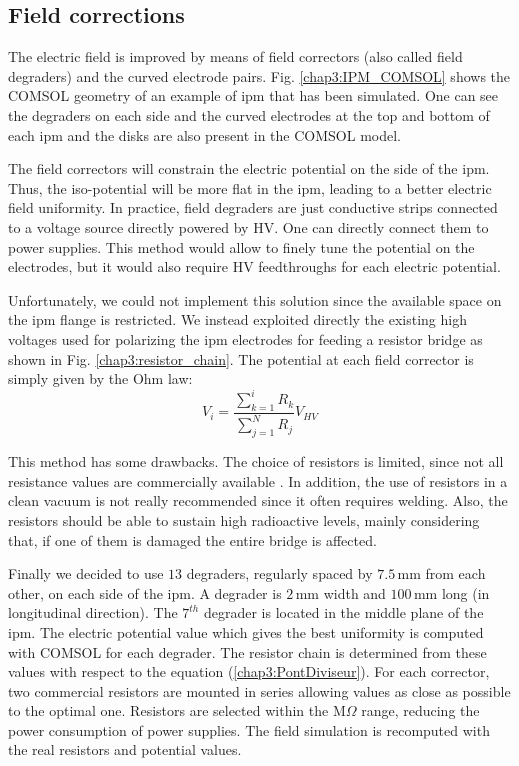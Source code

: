 \begin{refsection}
  \subsection{Field corrections}
  \label{chap3:field_corrections}
  
  The electric field is improved by means of field correctors (also called field degraders) and the curved electrode pairs. Fig. \ref{chap3:IPM_COMSOL} shows the COMSOL geometry of an example of \acrshort{ipm} that has been simulated. One can see the degraders on each side and the curved electrodes at the top and bottom of each \acrshort{ipm} and the disks are also present in the COMSOL model.

  The field correctors will constrain the electric potential on the side of the \acrshort{ipm}. Thus, the iso-potential will be more flat in the \acrshort{ipm}, leading to a better electric field uniformity. In practice, field degraders are just conductive strips connected to a voltage
  source directly powered by HV. One can directly connect them to power supplies. This method would allow to finely tune the potential on the electrodes, but it would also require HV feedthroughs for each electric potential.

  
  Unfortunately, we could not implement this solution since the available space on the \acrshort{ipm} flange is restricted. We instead exploited directly the existing high voltages used for polarizing the \acrshort{ipm} electrodes for feeding a resistor bridge as shown in Fig. \ref{chap3:resistor_chain}. The potential at each field corrector is simply given by the Ohm law:
  \begin{equation}
    V_{i} = \frac{\sum_{k = 1}^{i} R_{k}}{\sum_{j = 1}^{N} R_{j}}V_{HV} \label{chap3:PontDiviseur}
  \end{equation}

  This method has some drawbacks. The choice of resistors is limited, since not all resistance values are commercially available \cite{Vishay2012}. In addition, the use of resistors in a clean vacuum is not really recommended since it often requires welding. Also, the resistors should be able to sustain high radioactive levels, mainly considering that, if one of them is damaged the entire bridge is affected.

  Finally we decided to use $13$ degraders, regularly spaced by $7.5\,\mathrm{mm}$ from each other, on each side of the \acrshort{ipm}. A degrader is $2\,\mathrm{mm}$ width and $100\,\mathrm{mm}$ long (in longitudinal direction). The $7^{th}$ degrader is located in the middle plane of the \acrshort{ipm}.
  The electric potential value which gives the best uniformity is computed with COMSOL for each degrader. The resistor chain is determined from these values with respect to the equation (\ref{chap3:PontDiviseur}). For each corrector, two commercial resistors are mounted in series allowing values as close as possible to the optimal one. Resistors are selected within the $\mathrm{M}\Omega $ range, reducing the power consumption of power supplies. The field simulation is recomputed with the real resistors and potential values.


\end{refsection}
